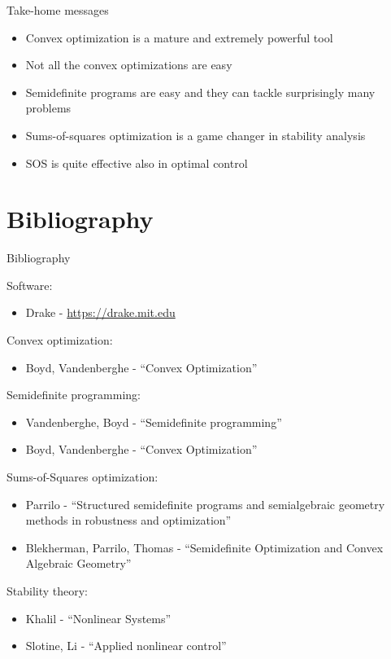 \documentclass[aspectratio=169]{beamer}
\begin{document}
\begin{frame}{Take-home messages}
\begin{itemize}
\item
Convex optimization is a mature and extremely powerful tool
\item
Not all the convex optimizations are easy
\item
Semidefinite programs are easy and they can tackle surprisingly many problems
\item
Sums-of-squares optimization is a game changer in stability analysis
\item
SOS is quite effective also in optimal control
\end{itemize}
\end{frame}

\section{Bibliography}
\begin{frame}
	\huge
	\centering
	{\color{darkred} Bibliography}
\end{frame}

\begin{frame}
\footnotesize
Software:
\begin{itemize}
\item
Drake - \href{https://drake.mit.edu}{{\color{blue}https://drake.mit.edu}}
\end{itemize}
Convex optimization:
\begin{itemize}
\item
Boyd, Vandenberghe - ``Convex Optimization''
\end{itemize}
Semidefinite programming:
\begin{itemize}
\item
Vandenberghe, Boyd - ``Semidefinite programming''
\item
Boyd, Vandenberghe - ``Convex Optimization''
\end{itemize}
Sums-of-Squares optimization:
\begin{itemize}
\item
Parrilo - ``Structured semidefinite programs and semialgebraic geometry methods in robustness and optimization''
\item
Blekherman, Parrilo, Thomas - ``Semidefinite Optimization and Convex Algebraic Geometry''
\end{itemize}
Stability theory:
\begin{itemize}
\item
Khalil - ``Nonlinear Systems''
\item
Slotine, Li - ``Applied nonlinear control''
\end{itemize}
\end{frame}
\end{document}
